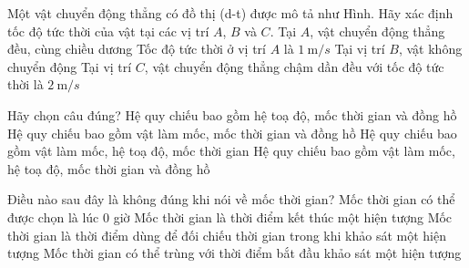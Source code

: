\begin{ex}
Một vật chuyển động thẳng có đồ thị (d-t) được mô tả như Hình. Hãy xác định tốc độ tức thời của vật tại các vị trí $A$, $B$ và $C$.
\choiceTF
{\True Tại $A$, vật chuyển động thẳng đều, cùng chiều dương}
{Tốc độ tức thời ở vị trí $A$ là $1\mathrm{~m} / s$}
{\True Tại vị trí $B$, vật không chuyển động}
{Tại vị trí $C$, vật chuyển động thẳng chậm dần đều với tốc độ tức thời là $2\mathrm{~m} / s$}
\end{ex}

\begin{ex}
Hãy chọn câu đúng?
\choice
{Hệ quy chiếu bao gồm hệ toạ độ, mốc thời gian và đồng hồ}
{Hệ quy chiếu bao gồm vật làm mốc, mốc thời gian và đồng hồ}
{Hệ quy chiếu bao gồm vật làm mốc, hệ toạ độ, mốc thời gian}
{\True Hệ quy chiếu bao gồm vật làm mốc, hệ toạ độ, mốc thời gian và đồng hồ}
\end{ex}

\begin{ex}
Điều nào sau đây là không đúng khi nói về mốc thời gian?
\choice
{Mốc thời gian có thể được chọn là lúc 0 giờ}
{\True Mốc thời gian là thời điểm kết thúc một hiện tượng}
{Mốc thời gian là thời điểm dùng để đối chiếu thời gian trong khi khảo sát một hiện tượng}
{Mốc thời gian có thể trùng với thời điểm bắt đầu khảo sát một hiện tượng}
\end{ex}

